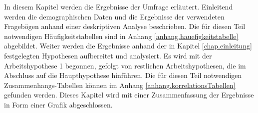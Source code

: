 %
%
\glsresetall
\let\raggedsection\centering
{}
\setcounter{chapter}{3}
\setcounter{section}{0}
\let\raggedsection\raggedright 
In diesem Kapitel werden die Ergebnisse der Umfrage erläutert. Einleitend werden die demographischen Daten und die Ergebnisse der verwendeten Fragebögen anhand einer deskriptiven Analyse beschrieben. Die für diesen Teil notwendigen Häufigkeitstabellen sind in Anhang \ref{anhang.hauefigkeitstabelle} abgebildet. Weiter werden die Ergebnisse anhand der in Kapitel \ref{chap.einleitung} festgelegten Hypothesen aufbereitet und analysiert. Es wird mit der Arbeitshypothese 1 begonnen, gefolgt von restlichen Arbeitshypothesen, die im Abschluss auf die Haupthypothese hinführen. Die für diesen Teil notwendigen Zusammenhangs-Tabellen können im Anhang \ref{anhang.korrelationsTabellen} gefunden werden. Dieses Kapitel wird mit einer Zusammenfassung der Ergebnisse in Form einer Grafik abgeschlossen.

